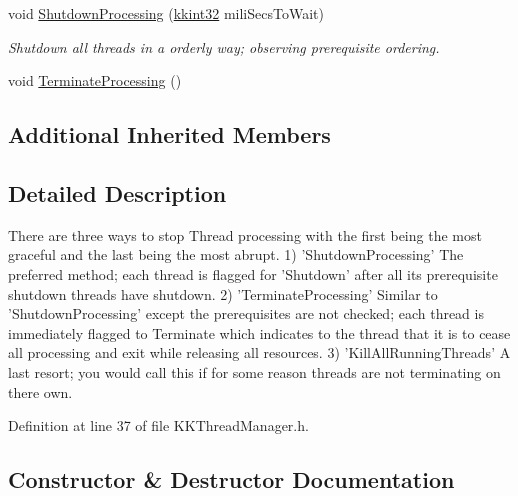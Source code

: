 \begin{DoxyCompactItemize}
\item 
void \hyperlink{class_k_k_b_1_1_k_k_thread_manager_ab578ab60b9244ebdc8c06edf631cddb7}{Shutdown\+Processing} (\hyperlink{namespace_k_k_b_a8fa4952cc84fda1de4bec1fbdd8d5b1b}{kkint32} mili\+Secs\+To\+Wait)
\begin{DoxyCompactList}\small\item\em Shutdown all threads in a orderly way; observing prerequisite ordering. \end{DoxyCompactList}\item 
void \hyperlink{class_k_k_b_1_1_k_k_thread_manager_a100bf207b53aa9f96a12081574c5ac51}{Terminate\+Processing} ()
\end{DoxyCompactItemize}
\subsection*{Additional Inherited Members}


\subsection{Detailed Description}

\begin{DoxyCode}
There are three ways to stop Thread processing with the first being the most graceful and the last being 
      the most abrupt.
1) \textcolor{stringliteral}{'ShutdownProcessing'}  The preferred method;  each thread is flagged \textcolor{keywordflow}{for} \textcolor{stringliteral}{'Shutdown'} after all its 
      prerequisite shutdown threads 
   have shutdown.
2) \textcolor{stringliteral}{'TerminateProcessing'} Similar to \textcolor{stringliteral}{'ShutdownProcessing'} except the prerequisites are not checked; each 
      thread is immediately flagged
   to Terminate which indicates to the thread that it is to cease all processing and exit \textcolor{keywordflow}{while} releasing 
      all resources.
3) \textcolor{stringliteral}{'KillAllRunningThreads'} A last resort;  you would call \textcolor{keyword}{this} \textcolor{keywordflow}{if} \textcolor{keywordflow}{for} some reason threads are not 
      terminating on there own.
\end{DoxyCode}
 

Definition at line 37 of file K\+K\+Thread\+Manager.\+h.



\subsection{Constructor \& Destructor Documentation}
